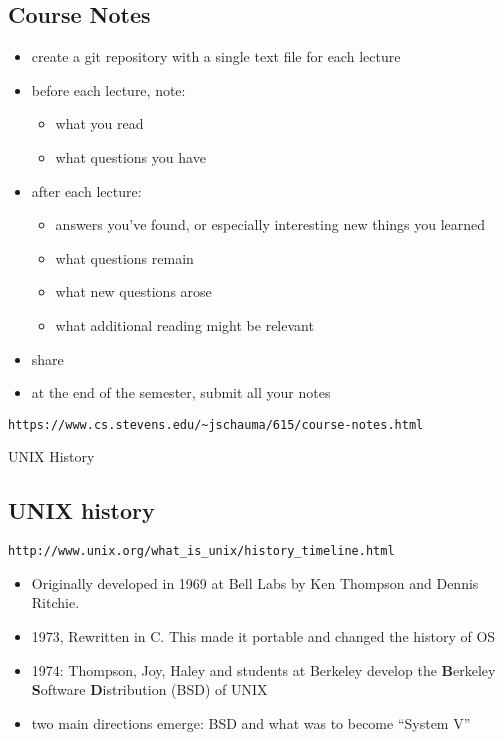 \documentclass[xga]{xdvislides}
\begin{document}
\subsection{Course Notes}
\begin{itemize}
	\item create a git repository with a single text file for each lecture
	\item before each lecture, note:
		\begin{itemize}
			\item what you read
			\item what questions you have
		\end{itemize}
	\item after each lecture:
		\begin{itemize}
			\item answers you've found, or especially interesting new things you learned
			\item what questions remain
			\item what new questions arose
			\item what additional reading might be relevant
		\end{itemize}
	\item share
	\item at the end of the semester, submit all your notes
\end{itemize}

\verb+https://www.cs.stevens.edu/~jschauma/615/course-notes.html+

\pagebreak

\vspace*{\fill}
\begin{center}
  \Hugesize
    UNIX History
	\hspace*{5mm}\blueline\\ [1em]
  \Normalsize
\end{center}
\vspace*{\fill}

\subsection{UNIX history}
\verb+http://www.unix.org/what_is_unix/history_timeline.html+ \\

\begin{itemize}
	\item Originally developed in 1969 at Bell Labs by Ken Thompson
		and Dennis Ritchie.
	\item 1973, Rewritten in C. This made it portable and changed the history of OS
	\item 1974: Thompson, Joy, Haley and students at Berkeley develop
		the {\bf B}erkeley {\bf S}oftware {\bf D}istribution (BSD) of UNIX
	\item two main directions emerge: BSD and what was to become ``System V''
\end{itemize}
\end{document}
